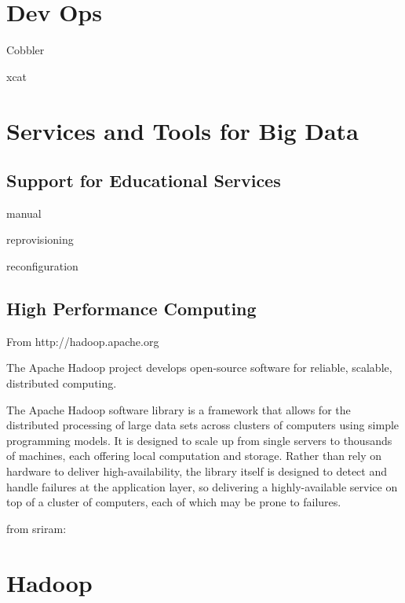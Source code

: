 \documentclass{article}
\begin{document}
\section{Dev Ops}

Cobbler

xcat



\section{Services and Tools for Big Data}

\subsection{Support for Educational Services}

manual

reprovisioning

reconfiguration

\subsection{High Performance Computing}

From http://hadoop.apache.org

The Apache Hadoop project develops open-source software for reliable, scalable, distributed computing.

The Apache Hadoop software library is a framework that allows for the distributed processing of large data sets across clusters of computers using simple programming models. It is designed to scale up from single servers to thousands of machines, each offering local computation and storage. Rather than rely on hardware to deliver high-availability, the library itself is designed to detect and handle failures at the application layer, so delivering a highly-available service on top of a cluster of computers, each of which may be prone to failures.

from sriram:

\section{Hadoop}
\end{document}
